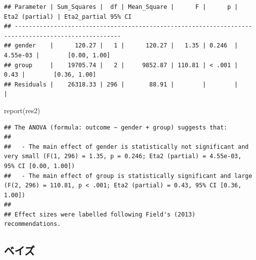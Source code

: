\documentclass[
  ja=standard, xelatex, base=12pt]{bxjsreport}
\newenvironment{Shaded}{\begin{snugshade}}{\end{snugshade}}
\newcommand{\FunctionTok}[1]{\textcolor[rgb]{0.00,0.00,0.00}{#1}}
\newcommand{\NormalTok}[1]{#1}
\begin{document}
\begin{verbatim}
## Parameter | Sum_Squares |  df | Mean_Square |      F |      p | Eta2 (partial) | Eta2_partial 95% CI
## ----------------------------------------------------------------------------------------------------
## gender    |      120.27 |   1 |      120.27 |   1.35 | 0.246  |       4.55e-03 |        [0.00, 1.00]
## group     |    19705.74 |   2 |     9852.87 | 110.81 | < .001 |           0.43 |        [0.36, 1.00]
## Residuals |    26318.33 | 296 |       88.91 |        |        |                |
\end{verbatim}

\begin{Shaded}
\begin{Highlighting}[]
\FunctionTok{report}\NormalTok{(res2)}
\end{Highlighting}
\end{Shaded}

\begin{verbatim}
## The ANOVA (formula: outcome ~ gender + group) suggests that:
## 
##   - The main effect of gender is statistically not significant and very small (F(1, 296) = 1.35, p = 0.246; Eta2 (partial) = 4.55e-03, 95% CI [0.00, 1.00])
##   - The main effect of group is statistically significant and large (F(2, 296) = 110.81, p < .001; Eta2 (partial) = 0.43, 95% CI [0.36, 1.00])
## 
## Effect sizes were labelled following Field's (2013) recommendations.
\end{verbatim}

\hypertarget{ux30d9ux30a4ux30ba-1}{%
\subsection{ベイズ}\label{ux30d9ux30a4ux30ba-1}}
\end{document}
